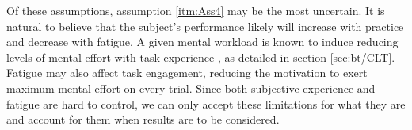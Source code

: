 Of these assumptions, assumption \ref{itm:Ass4} may be the most uncertain. It is natural to believe that the subject's performance likely will increase with practice and decrease with fatigue. A given mental workload is known to induce reducing levels of mental effort with task experience \cite{tulga1980}, as detailed in section \ref{sec:bt/CLT}. Fatigue may also affect task engagement, reducing the motivation to exert maximum mental effort on every trial. Since both subjective experience and fatigue are hard to control, we can only accept these limitations for what they are and account for them when results are to be considered.